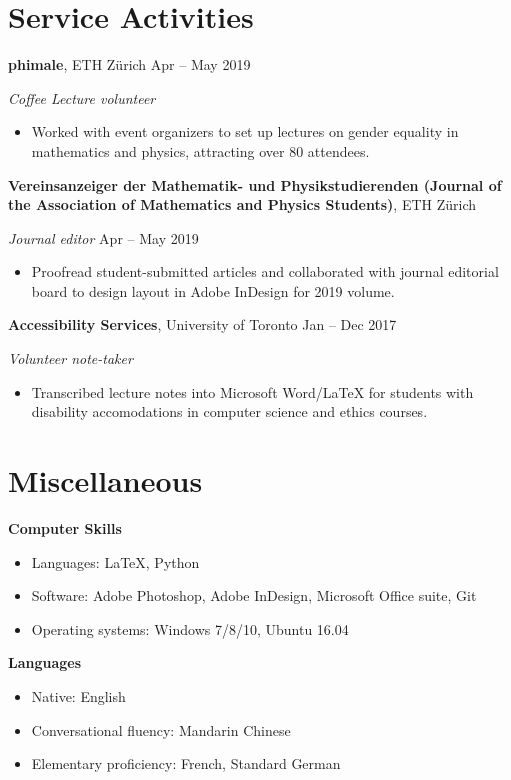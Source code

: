 \documentclass[letterpaper, 11pt]{aq-cv}
\begin{document}
\section*{Service Activities}

\textbf{phimale}, ETH Z\"{u}rich \hfill Apr -- May 2019

\textsl{Coffee Lecture volunteer}
\begin{itemize}[noitemsep, topsep=0pt]
    \item Worked with event organizers to set up lectures on gender equality in mathematics and physics, attracting over 80 attendees.
\end{itemize}\vspace{1ex}
\textbf{Vereinsanzeiger der Mathematik- und Physikstudierenden (Journal of the Association of Mathematics and Physics Students)}, ETH Z\"{u}rich

\textsl{Journal editor} \hfill Apr -- May 2019
\begin{itemize}[noitemsep, topsep=0pt]
    \item Proofread student-submitted articles and collaborated with journal editorial board to design layout in Adobe InDesign for 2019 volume.
\end{itemize}\vspace{1ex}
\textbf{Accessibility Services}, University of Toronto \hfill Jan -- Dec 2017

\textsl{Volunteer note-taker}
\begin{itemize}[noitemsep, topsep=0pt]
    \item Transcribed lecture notes into Microsoft Word/\LaTeX{} for students with disability accomodations in computer science and ethics courses.
\end{itemize}

\section*{Miscellaneous}

\textbf{Computer Skills}
\begin{itemize}[noitemsep, topsep=0pt]
    \item Languages: \LaTeX{}, Python
    \item Software: Adobe Photoshop, Adobe InDesign, Microsoft Office suite, Git
    \item Operating systems: Windows 7/8/10, Ubuntu 16.04
\end{itemize}\vspace{1ex}
\textbf{Languages}
\begin{itemize}[noitemsep, topsep=0pt]
    \item Native: English
    \item Conversational fluency: Mandarin Chinese
    \item Elementary proficiency: French, Standard German
\end{itemize}
\end{document}
